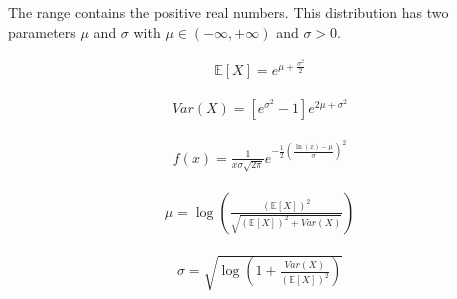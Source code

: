 \documentclass{article}
\begin{document}
\begin{flushleft}
    The range contains the positive real numbers.
    This distribution has two parameters $\mu$ and $\sigma$ with $\mu \in (-\infty, +\infty)$ and $\sigma > 0$.

    \begin{align*}
        \mathbb{E}[X] = e^{\mu+\frac{\sigma^2}{2}}
    \end{align*}

    \begin{align*}
        Var(X) = [e^{\sigma^2}-1]e^{2\mu+\sigma^2}
    \end{align*}

    \begin{align*}
        f(x) = \frac{1}{x\sigma\sqrt{2\pi}}e^{-\frac{1}{2}\left(\frac{\ln(x)-\mu}{\sigma}\right)^2}
    \end{align*}

    \begin{align*}
        \mu = \log\left(\frac{(\mathbb{E}[X])^2}{\sqrt{(\mathbb{E}[X])^2+Var(X)}}\right)
    \end{align*}

    \begin{align*}
        \sigma = \sqrt{\log\left(1+\frac{Var(X)}{(\mathbb{E}[X])^2}\right)}
    \end{align*}

\end{flushleft}
\end{document}
